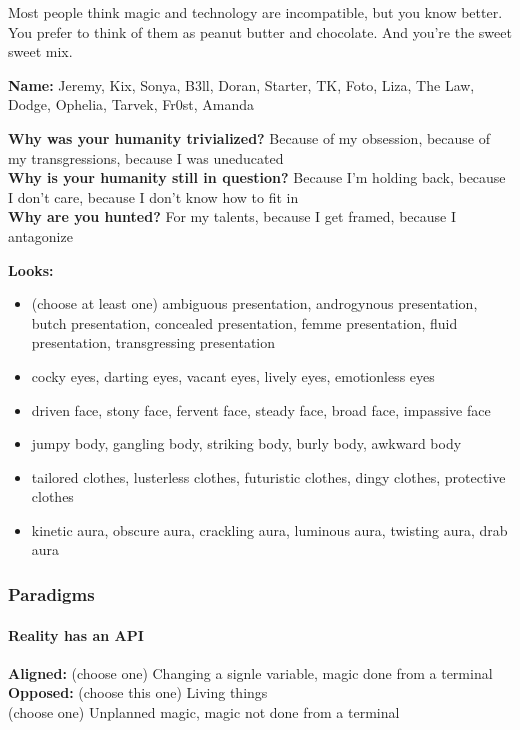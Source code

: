 \documentclass[
]{article}
\providecommand{\tightlist}{%
  \setlength{\itemsep}{0pt}\setlength{\parskip}{0pt}}
\begin{document}
Most people think magic and technology are incompatible, but you know
better. You prefer to think of them as peanut butter and chocolate. And
you're the sweet sweet mix.

\textbf{Name:} Jeremy, Kix, Sonya, B3ll, Doran, Starter, TK, Foto, Liza,
The Law, Dodge, Ophelia, Tarvek, Fr0st, Amanda

\textbf{Why was your humanity trivialized?} Because of my obsession,
because of my transgressions, because I was uneducated\\
\textbf{Why is your humanity still in question?} Because I'm holding
back, because I don't care, because I don't know how to fit in\\
\textbf{Why are you hunted?} For my talents, because I get framed,
because I antagonize

\textbf{Looks:}

\begin{itemize}
\tightlist
\item
  (choose at least one) ambiguous presentation, androgynous
  presentation, butch presentation, concealed presentation, femme
  presentation, fluid presentation, transgressing presentation
\item
  cocky eyes, darting eyes, vacant eyes, lively eyes, emotionless eyes
\item
  driven face, stony face, fervent face, steady face, broad face,
  impassive face
\item
  jumpy body, gangling body, striking body, burly body, awkward body
\item
  tailored clothes, lusterless clothes, futuristic clothes, dingy
  clothes, protective clothes
\item
  kinetic aura, obscure aura, crackling aura, luminous aura, twisting
  aura, drab aura
\end{itemize}

\hypertarget{paradigms-6}{%
\subsubsection{Paradigms}\label{paradigms-6}}

\hypertarget{reality-has-an-api}{%
\paragraph{Reality has an API}\label{reality-has-an-api}}

\textbf{Aligned:} (choose one) Changing a signle variable, magic done
from a terminal\\
\textbf{Opposed:} (choose this one) Living things\\
(choose one) Unplanned magic, magic not done from a terminal
\end{document}
